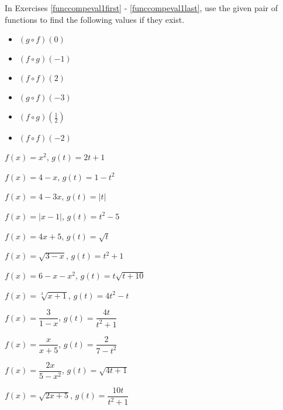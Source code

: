\startexenum

\label{ExercisesforFunctionComposition}


In Exercises \ref{funccompeval1first} - \ref{funccompeval1last}, use the given pair of functions to find the following values if they exist.

\begin{multicols}{3}

\begin{itemize}

\item  $(g\circ f)(0)$

\item  $(f\circ g)(-1)$

\item  $(f \circ f)(2)$

\end{itemize}

\end{multicols}

\begin{multicols}{3}

\begin{itemize}

\item  $(g\circ f)(-3)$

\item  $(f\circ g)\left(\frac{1}{2}\right)$

\item  $(f \circ f)(-2)$

\end{itemize}

\end{multicols}

\begin{shortexenum}
\item  $f(x) = x^2$, $g(t) = 2t+1$ \label{funccompeval1first}
\item  $f(x) = 4-x$, $g(t) = 1-t^2$
\item  $f(x) = 4-3x$, $g(t) = |t|$
\item  $f(x) = |x-1|$, $g(t) = t^2-5$
\item  $f(x) = 4x+5$, $g(t) = \sqrt{t}$
\item  $f(x) = \sqrt{3-x}$, $g(t) = t^2+1$
\item  $f(x) = 6-x-x^2$, $g(t) = t\sqrt{t+10}$
\item  $f(x) = \sqrt[3]{x+1}$, $g(t) = 4t^2-t$
\item  $f(x) = \dfrac{3}{1-x}$, $g(t) = \dfrac{4t}{t^2+1}$
\item  $f(x) = \dfrac{x}{x+5}$, $g(t) = \dfrac{2}{7-t^2}$
\item  $f(x) = \dfrac{2x}{5-x^2}$, $g(t) = \sqrt{4t+1}$
\item  $f(x) =\sqrt{2x+5}$, $g(t) = \dfrac{10t}{t^2+1}$ \label{funccompeval1last}
\end{shortexenum}

